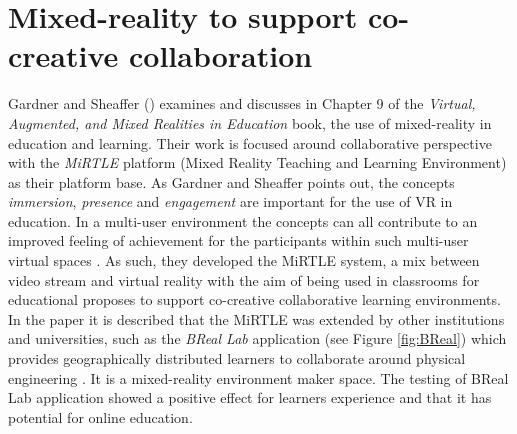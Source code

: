 


\section{Mixed-reality to support co-creative collaboration}
Gardner and Sheaffer (\citeyear{gardner2017systems}) examines and discusses in Chapter 9 of the \textit{Virtual, Augmented, and Mixed Realities in Education} \cite{liu2017virtual} book, the use of mixed-reality in education and learning. Their work is focused around collaborative perspective with the \textit{MiRTLE} platform (Mixed Reality Teaching and Learning Environment) as their platform base.    
As Gardner and Sheaffer points out, the concepts \textit{immersion}, \textit{presence} and \textit{engagement} are important for the use of VR in education. In a multi-user environment the concepts can all contribute to an improved feeling of achievement for the participants within such multi-user virtual spaces \cite{gardner2017systems}. As such, they developed the MiRTLE system, a mix between video stream and virtual reality with the aim of being used in classrooms for educational proposes to support co-creative collaborative learning environments. In the paper it is described that the MiRTLE was extended by other institutions and universities, such as the \textit{BReal Lab} application (see Figure \ref{fig:BReal}) which provides geographically distributed learners to collaborate around physical engineering \cite{gardner2017systems}. It is a mixed-reality environment maker space. The testing of BReal Lab application showed a positive effect for learners experience and that it has potential for online education.            

